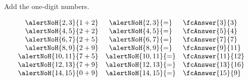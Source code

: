 \begin{frame}
\begin{example}
Add the one-digit numbers. 

\[
\begin{array}{rcl}
\alertNoH{2 ,3 }{1 + 2} &\alertNoH{2 ,3 }{=}&\fcAnswer{3 }{3 }\\
\alertNoH{4 ,5 }{2 + 2} &\alertNoH{4 ,5 }{=}&\fcAnswer{5 }{4 }\\
\alertNoH{6 ,7 }{2 + 5} &\alertNoH{6 ,7 }{=}&\fcAnswer{7 }{7 }\\
\alertNoH{8 ,9 }{2 + 9} &\alertNoH{8 ,9 }{=}&\fcAnswer{9 }{11}\\
\alertNoH{10,11}{7 + 5} &\alertNoH{10,11}{=}&\fcAnswer{11}{12}\\
\alertNoH{12,13}{7 + 9} &\alertNoH{12,13}{=}&\fcAnswer{13}{16}\\
\alertNoH{14,15}{0 + 9} &\alertNoH{14,15}{=}&\fcAnswer{15}{9}\\
\end{array}
\]
\end{example}
\end{frame}